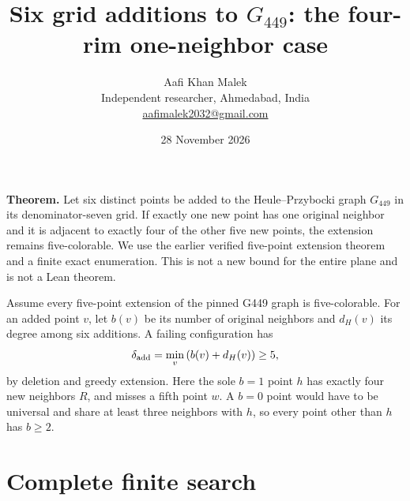 \documentclass[11pt,letterpaper]{article}
\title{Six grid additions to \(G_{449}\): the four-rim one-neighbor case}
\author{Aafi Khan Malek\\ \small Independent researcher, Ahmedabad, India\\
\small\href{mailto:aafimalek2032@gmail.com}{aafimalek2032@gmail.com}}
\date{28 November 2026}
\begin{document}
\maketitle
\textbf{Theorem.} Let six distinct points be added to the
Heule--Przybocki graph \(G_{449}\) in its denominator-seven grid.
If exactly one new point has one original neighbor and it is adjacent
to exactly four of the other five new points, the extension remains
five-colorable. We use the earlier verified five-point extension
theorem and a finite exact enumeration. This is not a new bound for
the entire plane and is not a Lean theorem.

Assume every five-point extension of the pinned G449 graph is
five-colorable. For an added point \(v\), let \(b(v)\) be its number of
original neighbors and \(d_H(v)\) its degree among six additions. A
failing configuration has \[
\delta_{\rm add}=\min_v\left(b(v)+d_H(v)\right)\ge5,
\] by deletion and greedy extension. Here the sole \(b=1\) point \(h\)
has exactly four new neighbors \(R\), and misses a fifth point \(w\). A
\(b=0\) point would have to be universal and share at least three
neighbors with \(h\), so every point other than \(h\) has \(b\ge2\).

\section{Complete finite search}\label{complete-finite-search}
\end{document}
